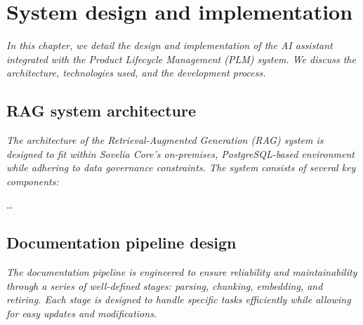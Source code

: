 \chapter{System design and implementation}
\label{ch:system-design-and-implementation}

\textit{In this chapter, we detail the design and implementation of the AI assistant integrated with the Product Lifecycle Management (PLM) system. We discuss the architecture, technologies used, and the development process.}

\section{RAG system architecture}
\label{sec:rag-system-architecture}

\textit{The architecture of the Retrieval-Augmented Generation (RAG) system is designed to fit within Sovelia Core's on-premises, PostgreSQL-based environment while adhering to data governance constraints. The system consists of several key components:}

\dots

\section{Documentation pipeline design}
\label{sec:documentation-pipeline-design}

\textit{The documentation pipeline is engineered to ensure reliability and maintainability through a series of well-defined stages: parsing, chunking, embedding, and retiring. Each stage is designed to handle specific tasks efficiently while allowing for easy updates and modifications.}
